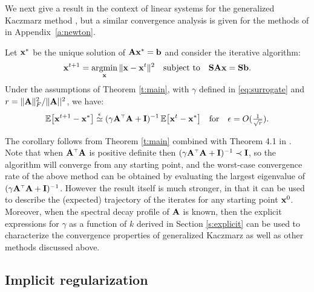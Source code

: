 \documentclass{article}
\begin{document}
We next 
give a result in the context of linear systems
for the generalized Kaczmarz method \cite{generalized-kaczmarz}, but a similar
convergence analysis is given for the methods of
\cite{Gower2019,jacsketch} in Appendix~\ref{a:newton}.
\begin{corollary}\label{c:kaczmarz}
Let $\mathbf x^*$ be the unique solution of $\mathbf A\mathbf x^*=\mathbf b$ and consider
  the iterative algorithm:
  \begin{align*}
    \mathbf x^{t+1} = \operatorname*{\mathop{\mathrm{argmin}}}_\mathbf x\|\mathbf x-\mathbf x^t\|^2\quad\textnormal{subject to}\quad\mathbf{S}\mathbf A\mathbf x=\mathbf{S}\mathbf b.
  \end{align*}
Under the assumptions of Theorem \ref{t:main}, with $\gamma$ defined in
\eqref{eq:surrogate} and $r=\|\mathbf A\|_F^2/\|\mathbf A||^2$, we have:
  \begin{align*}
    \E\big[\x^{t+1}-\x^*\big] \overset\epsilon\simeq 
    (\gamma\A^\top\A+\I)^{-1}\,\E\big[\x^t-\x^*\big]
    \quad\text{for}\quad\epsilon=O(\tfrac1{\sqrt r}). 
  \end{align*}
\end{corollary}
The corollary follows from Theorem \ref{t:main} combined with Theorem
4.1 in \cite{generalized-kaczmarz}. 
Note that when $\A^\top\A$ is positive definite then
$(\gamma\A^\top\A+\I)^{-1}\prec\I$, so the algorithm will
converge from any starting point, and the worst-case convergence rate of the above method can be
obtained by evaluating the largest eigenvalue of
$(\gamma\A^\top\A+\I)^{-1}$. However the result itself is much
stronger, in that it can be used to describe the (expected) trajectory of the
iterates for any starting point $\mathbf x^0$. Moreover, when the spectral decay
profile of $\mathbf A$ is known, then the explicit expressions for $\gamma$
as a function of $k$ derived in Section \ref{s:explicit} can be used
to characterize the convergence properties of generalized Kaczmarz as
well as other methods discussed above.

\subsection{Implicit regularization}\label{s:implicit}
\end{document}
